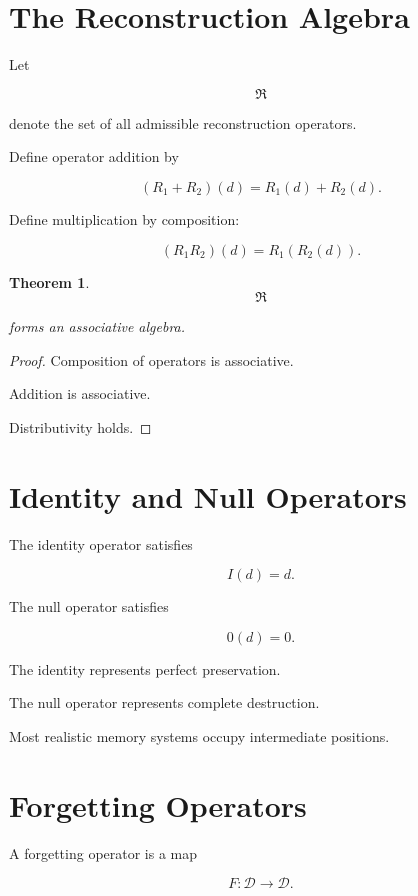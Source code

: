 \documentclass[12pt,oneside]{book}
\theoremstyle{plain} \newtheorem{theorem}{Theorem}[chapter] \newtheorem{lemma}[theorem]{Lemma} \newtheorem{proposition}[theorem]{Proposition} \newtheorem{corollary}[theorem]{Corollary}
\theoremstyle{definition} \newtheorem{definition}[theorem]{Definition} \newtheorem{axiom}[theorem]{Axiom} \newtheorem{construction}[theorem]{Construction}
\theoremstyle{remark} \newtheorem{remark}[theorem]{Remark} \newtheorem{example}[theorem]{Example}
\begin{document}
\section{The Reconstruction Algebra}

Let

\[
\mathfrak R
\]

denote the set of all admissible reconstruction operators.

Define operator addition by

\[
(R_1+R_2)(d)
=
R_1(d)+R_2(d).
\]

Define multiplication by composition:

\[
(R_1R_2)(d)
=
R_1(R_2(d)).
\]

\begin{theorem}

\[
\mathfrak R
\]

forms an associative algebra.

\end{theorem}

\begin{proof}

Composition of operators is associative.

Addition is associative.

Distributivity holds.

\end{proof}

\section{Identity and Null Operators}

The identity operator satisfies

\[
I(d)
=
d.
\]

The null operator satisfies

\[
0(d)
=
0. 

\]

The identity represents perfect preservation.

The null operator represents complete destruction.

Most realistic memory systems occupy intermediate positions.

\section{Forgetting Operators}

A forgetting operator is a map

\[
F
:
\mathcal D
\rightarrow
\mathcal D.
\]
\end{document}
